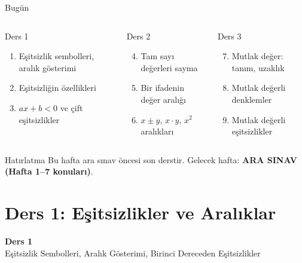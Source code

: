 \documentclass[aspectratio=169,11pt,handout]{beamer}
\begin{document}
\begin{frame}{Bugün}
\begin{columns}[t]
\begin{block}{Ders 1}
\begin{enumerate}
\item Eşitsizlik sembolleri, aralık gösterimi
\item Eşitsizliğin özellikleri
\item \(ax+b<0\) ve çift eşitsizlikler
\end{enumerate}
\end{block}
\begin{block}{Ders 2}
\begin{enumerate}\setcounter{enumi}{3}
\item Tam sayı değerleri sayma
\item Bir ifadenin değer aralığı
\item \(x\pm y\), \(x\cdot y\), \(x^2\) aralıkları
\end{enumerate}
\end{block}
\begin{block}{Ders 3}
\begin{enumerate}\setcounter{enumi}{6}
\item Mutlak değer: tanım, uzaklık
\item Mutlak değerli denklemler
\item Mutlak değerli eşitsizlikler
\end{enumerate}
\end{block}
\end{columns}
\vspace{6pt}
\begin{alertblock}{Hatırlatma}
Bu hafta ara sınav öncesi son derstir. Gelecek hafta: \textbf{ARA SINAV (Hafta 1--7 konuları)}.
\end{alertblock}
\end{frame}

\section{Ders 1: Eşitsizlikler ve Aralıklar}
\begin{frame}
\centering\Large\color{anamavi}\textbf{Ders 1}\\[6pt]\normalsize Eşitsizlik Sembolleri, Aralık Gösterimi, Birinci Dereceden Eşitsizlikler
\end{frame}
\end{document}
